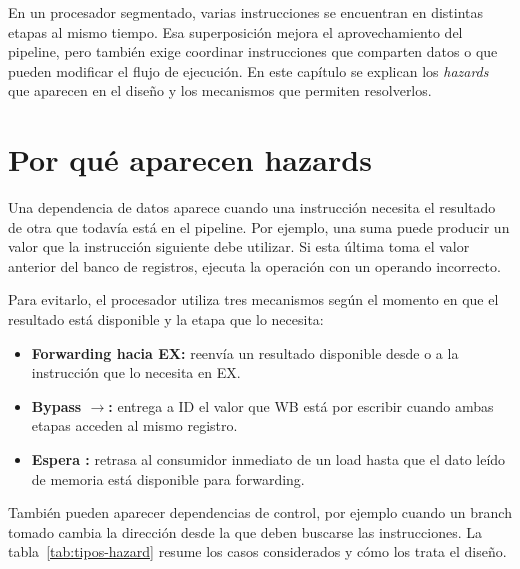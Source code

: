 En un procesador segmentado, varias instrucciones se encuentran en distintas
etapas al mismo tiempo. Esa superposición mejora el aprovechamiento del
pipeline, pero también exige coordinar instrucciones que comparten datos o que
pueden modificar el flujo de ejecución. En este capítulo se explican los
\emph{hazards} que aparecen en el diseño y los mecanismos que permiten resolverlos.

\section{Por qué aparecen hazards}

Una dependencia de datos aparece cuando una instrucción necesita el resultado
de otra que todavía está en el pipeline. Por ejemplo, una suma puede producir
un valor que la instrucción siguiente debe utilizar. Si esta última toma el
valor anterior del banco de registros, ejecuta la operación con un operando
incorrecto.

Para evitarlo, el procesador utiliza tres mecanismos según el momento en que el
resultado está disponible y la etapa que lo necesita:

\begin{itemize}
  \item \textbf{Forwarding hacia EX:} reenvía un resultado disponible desde
     o  a la instrucción que lo necesita en EX.
  \item \textbf{Bypass $\rightarrow$:} entrega a ID el valor
    que WB está por escribir cuando ambas etapas acceden al mismo registro.
  \item \textbf{Espera :} retrasa al consumidor inmediato de un
    load hasta que el dato leído de memoria está disponible para forwarding.
\end{itemize}

También pueden aparecer dependencias de control, por ejemplo cuando un branch
tomado cambia la dirección desde la que deben buscarse las instrucciones. La
tabla~\ref{tab:tipos-hazard} resume los casos considerados y cómo los trata el
diseño.

